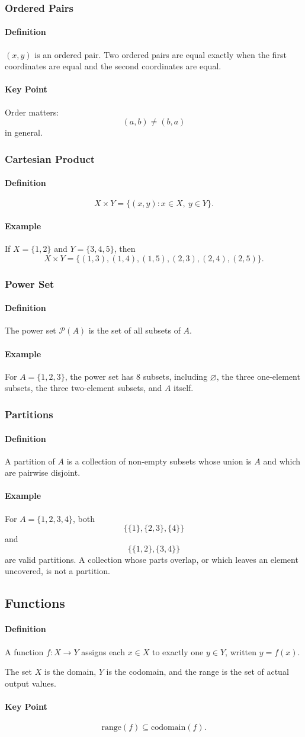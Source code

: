 \documentclass[12pt]{article}
\newcommand{\Definition}{\paragraph{Definition}}
\newcommand{\Example}{\paragraph{Example}}
\newcommand{\KeyPoint}{\paragraph{Key Point}}
\begin{document}
\subsubsection{Ordered Pairs}
\Definition $(x,y)$ is an ordered pair. Two ordered pairs are equal exactly when the first coordinates are equal and the second coordinates are equal.

\KeyPoint Order matters:
\[
(a,b)\ne(b,a)
\]
in general.

\subsubsection{Cartesian Product}
\Definition
\[
X\times Y=\{(x,y):x\in X,\ y\in Y\}.
\]

\Example If $X=\{1,2\}$ and $Y=\{3,4,5\}$, then
\[
X\times Y=\{(1,3),(1,4),(1,5),(2,3),(2,4),(2,5)\}.
\]

\subsubsection{Power Set}
\Definition The power set $\mathcal P(A)$ is the set of all subsets of $A$.

\Example For $A=\{1,2,3\}$, the power set has $8$ subsets, including $\varnothing$, the three one-element subsets, the three two-element subsets, and $A$ itself.

\subsubsection{Partitions}
\Definition A partition of $A$ is a collection of non-empty subsets whose union is $A$ and which are pairwise disjoint.

\Example For $A=\{1,2,3,4\}$, both
\[
\{\{1\},\{2,3\},\{4\}\}
\]
and
\[
\{\{1,2\},\{3,4\}\}
\]
are valid partitions. A collection whose parts overlap, or which leaves an element uncovered, is not a partition.

\subsection{Functions}

\Definition A function $f:X\rightarrow Y$ assigns each $x\in X$ to exactly one $y\in Y$, written $y=f(x)$.

The set $X$ is the domain, $Y$ is the codomain, and the range is the set of actual output values.

\KeyPoint
\[
\text{range}(f)\subseteq\text{codomain}(f).
\]
\end{document}
